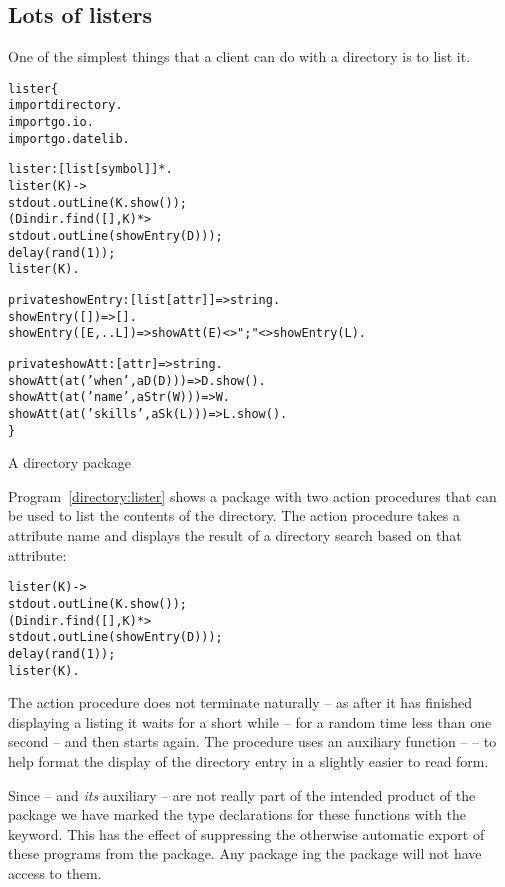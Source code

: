 \subsection{Lots of listers}
One of the simplest things that a client can do with a directory is to list it. 
\begin{program}[tb]
\vspace{0.5ex}
\begin{alltt}
lister\{
  import directory.
  import go.io.
  import go.datelib.
  
  lister:[list[symbol]]*.
  lister(K) ->
    stdout.outLine(K.show());
    (D in dir.find([],K) *> 
          stdout.outLine(showEntry(D)));
    delay(rand(1));
    lister(K).
  
  private showEntry:[list[attr]]=>string.
  showEntry([]) => [].
  showEntry([E,..L]) => showAtt(E)<>"; "<>showEntry(L).

  private showAtt:[attr]=>string.
  showAtt(at('when',aD(D))) => D.show().
  showAtt(at('name',aStr(W))) => W.
  showAtt(at('skills',aSk(L))) => L.show().
\}
\end{alltt}
\vspace{-2ex}
\caption{A directory  package}
\label{directory:lister}
\end{program}
Program~\vref{directory:lister} shows a package with two action procedures that can be used to list the contents of the directory. The  action procedure takes a attribute name and displays the result of a directory search based on that attribute:
\begin{alltt}
lister(K) ->
    stdout.outLine(K.show());
    (D in dir.find([],K) *> 
       stdout.outLine(showEntry(D)));
    delay(rand(1));
    lister(K).
\end{alltt}
The  action procedure does not  terminate naturally -- as after it has finished displaying a listing it waits for a short while -- for a random time less than one second  -- and then starts again. The  procedure uses an auxiliary function --  -- to help format the display of the directory entry in a slightly easier to read form.

Since  -- and \emph{its} auxiliary  -- are not really part of the intended product of the  package we have marked the type declarations for these functions with the  keyword. This has the effect of suppressing the otherwise automatic export of these programs from the package. Any package ing the  package will not have access to them.

